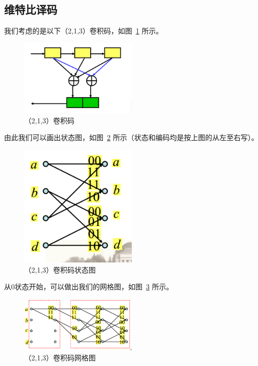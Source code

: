 \documentclass[UTF8]{ctexart}
\begin{document}
\subsection{维特比译码}

我们考虑的是以下（2,1,3）卷积码，如图~\ref{fig:213} 所示。

\begin{figure}[htbp]
    \centering
    \includegraphics[width=0.5\textwidth]{figs/213}
    \caption{（2,1,3）卷积码}
    \label{fig:213}
\end{figure}

由此我们可以画出状态图，如图~\ref{fig:statuses} 所示（状态和编码均是按上图的从左至右写）。

\begin{figure}[htbp]
    \centering
    \includegraphics[width=0.5\textwidth]{figs/statuses}
    \caption{（2,1,3）卷积码状态图}
    \label{fig:statuses}
\end{figure}

从0状态开始，可以做出我们的网格图，如图~\ref{fig:status_network} 所示。

\begin{figure}[htbp]
    \centering
    \includegraphics[width=0.5\textwidth]{figs/status_network}
    \caption{（2,1,3）卷积码网格图}
    \label{fig:status_network}
\end{figure}
\end{document}

